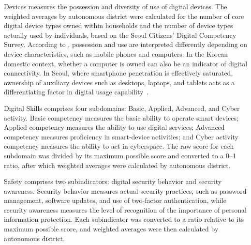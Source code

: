 Devices measures the possession and diversity of use of digital devices. The weighted averages by autonomous district were calculated for the number of core digital device types owned within households and the number of device types actually used by individuals, based on the Seoul Citizens' Digital Competency Survey. According to \citet{ITU2023}, possession and use are interpreted differently depending on device characteristics, such as mobile phones and computers. In the Korean domestic context, whether a computer is owned can also be an indicator of digital connectivity. In Seoul, where smartphone penetration is effectively saturated, ownership of auxiliary devices such as desktops, laptops, and tablets acts as a differentiating factor in digital usage capability~\citep{vanDeursenHelsper2015}.

Digital Skills comprises four subdomains: Basic, Applied, Advanced, and Cyber activity. Basic competency measures the basic ability to operate smart devices; Applied competency measures the ability to use digital services; Advanced competency measures proficiency in smart-device activities; and Cyber activity competency measures the ability to act in cyberspace. The raw score for each subdomain was divided by its maximum possible score and converted to a 0--1 ratio, after which weighted averages were calculated by autonomous district.

Safety comprises two subindicators: digital security behavior and security awareness. Security behavior measures actual security practices, such as password management, software updates, and use of two-factor authentication, while security awareness measures the level of recognition of the importance of personal information protection. Each subindicator was converted to a ratio relative to its maximum possible score, and weighted averages were then calculated by autonomous district.

